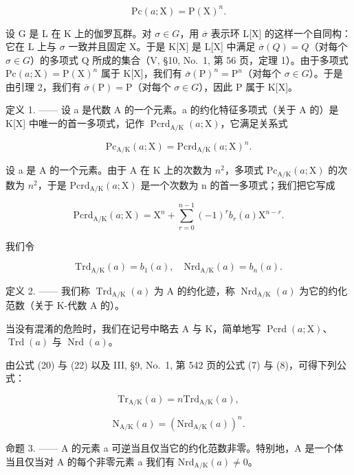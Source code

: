 \[
\mathrm{Pc} (a; \mathrm{X}) = \mathrm{P} (\mathrm{X}) ^ {n}.\tag{19}
\]

设 G 是 L 在 K 上的伽罗瓦群。对 \(\sigma\in G\)，用 \(\overline{\sigma}\) 表示环 L{[}X{]} 的这样一个自同构：它在 L 上与 \(\sigma\) 一致并且固定 X。于是 K{[}X{]} 是 L{[}X{]} 中满足 \(\overline{\sigma}(Q)=Q\)（对每个 \(\sigma\in G\)）的多项式 Q 所成的集合（V, §10, No.~1, 第 56 页，定理 1）。由于多项式 \(\mathrm{Pc}(a;\mathrm{X})=\mathrm{P}(\mathrm{X})^{n}\) 属于 K{[}X{]}，我们有 \(\overline{\sigma}(\mathrm{P})^{n}=\mathrm{P}^{n}\)（对每个 \(\sigma\in G\)）。于是由引理 2，我们有 \(\overline{\sigma}(\mathrm{P})=\mathrm{P}\)（对每个 \(\sigma\in G\)），因此 P 属于 K{[}X{]}。

定义 1. —— 设 a 是代数 A 的一个元素。a 的约化特征多项式（关于 A 的）是 K{[}X{]} 中唯一的首一多项式，记作 \(\operatorname{Pcrd}_{\mathrm{A}/\mathrm{K}}(a;\mathrm{X})\)，它满足关系式

\[
\mathrm{Pc} _ {\mathrm{A/K}} (a; \mathrm{X}) = \mathrm{Pcrd} _ {\mathrm{A/K}} (a; \mathrm{X}) ^ {n}.\tag{20}
\]

设 a 是 A 的一个元素。由于 A 在 K 上的次数为 \(n^{2}\)，多项式 \(\mathrm{Pc}_{\mathrm{A/K}}(a;\mathrm{X})\) 的次数为 \(n^{2}\)，于是 \(\mathrm{Pcrd}_{\mathrm{A/K}}(a;\mathrm{X})\) 是一个次数为 n 的首一多项式；我们把它写成

\[
\mathrm{Pcrd} _ {\mathrm{A/K}} (a; \mathrm{X}) = \mathrm{X} ^ {n} + \sum_ {r = 0} ^ {n - 1} (- 1) ^ {r} b _ {r} (a) \mathrm{X} ^ {n - r}.\tag{21}
\]

我们令

\[
\mathrm{Trd} _ {\mathrm{A/K}} (a) = b _ {1} (a), \quad \mathrm{Nrd} _ {\mathrm{A/K}} (a) = b _ {n} (a).\tag{22}
\]

定义 2. —— 我们称 \(\operatorname{Trd}_{\mathrm{A/K}}(a)\) 为 A 的约化迹，称 \(\operatorname{Nrd}_{\mathrm{A/K}}(a)\) 为它的约化范数（关于 K-代数 A 的）。

当没有混淆的危险时，我们在记号中略去 A 与 K，简单地写 \(\operatorname{Pcrd}(a; \mathrm{X})\)、\(\operatorname{Trd}(a)\) 与 \(\operatorname{Nrd}(a)\)。

由公式 (20) 与 (22) 以及 III, §9, No.~1, 第 542 页的公式 (7) 与 (8)，可得下列公式：

\[
\mathrm{Tr} _ {\mathrm{A/K}} (a) = n \mathrm{Trd} _ {\mathrm{A/K}} (a),\tag{23}
\]

\[
\mathrm{N} _ {\mathrm{A/K}} (a) = (\mathrm{Nrd} _ {\mathrm{A/K}} (a)) ^ {n}.\tag{24}
\]

命题 3. —— A 的元素 a 可逆当且仅当它的约化范数非零。特别地，A 是一个体当且仅当对 A 的每个非零元素 a 我们有 \(\mathrm{Nrd}_{\mathrm{A}/\mathrm{K}}(a) \neq 0\)。


